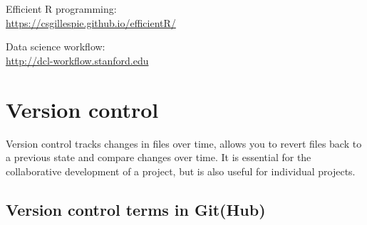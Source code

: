 \documentclass[
  letterpaper,
  DIV=11,
  numbers=noendperiod]{scrreport}
\begin{document}
Efficient R programming:\\
\url{https://csgillespie.github.io/efficientR/}

Data science workflow:\\
\url{http://dcl-workflow.stanford.edu}


\chapter{Version control}\label{sec-git}

Version control tracks changes in files over time, allows you to revert
files back to a previous state and compare changes over time. It is
essential for the collaborative development of a project, but is also
useful for individual projects.

\section{Version control terms in
Git(Hub)}\label{version-control-terms-in-github}
\end{document}
